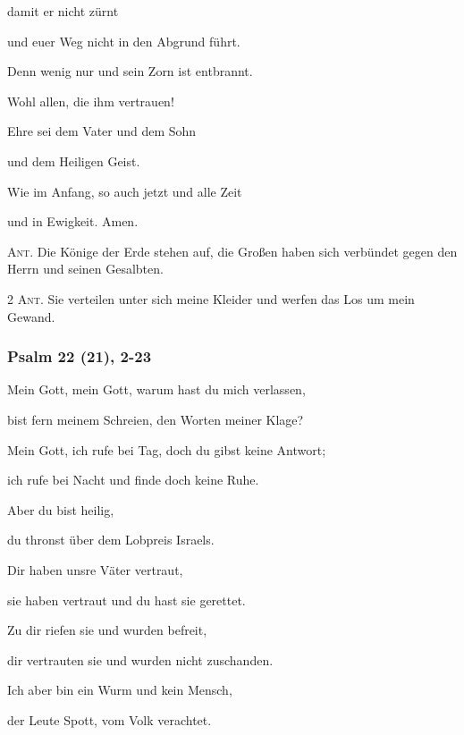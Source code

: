 \noindent damit er nicht zürnt~\GreStar{}~\nopagebreak

und euer Weg nicht in den Abgrund führt. 
 
\noindent Denn wenig nur und sein Zorn ist entbrannt.~\GreStar{}~\nopagebreak

Wohl allen, die ihm vertrauen!

\noindent Ehre sei dem Vater und dem Sohn~\GreStar{}~\nopagebreak

und dem Heiligen Geist.

\noindent Wie im Anfang, so auch jetzt und alle Zeit~\GreStar{}~\nopagebreak

und in Ewigkeit. Amen.

\vspace{10pt}

\noindent \textsc{Ant.} Die Könige der Erde stehen auf, die Großen haben sich verbündet gegen den Herrn und seinen Gesalbten.

\vspace{10pt}


\noindent \textsc{2 Ant.} Sie verteilen unter sich meine Kleider und werfen das Los um mein Gewand.

\subsubsection{Psalm 22 (21), 2-23}

\noindent Mein Gott, mein Gott, warum hast du mich verlassen,~\GreStar{}~\nopagebreak

bist fern meinem Schreien, den Worten meiner Klage?
 
\noindent Mein Gott, ich rufe bei Tag, doch du gibst keine Antwort;~\GreStar{}~\nopagebreak

ich rufe bei Nacht und finde doch keine Ruhe.
 
\noindent Aber du bist heilig,~\GreStar{}~\nopagebreak

du thronst über dem Lobpreis Israels.
 
\noindent Dir haben unsre Väter vertraut,~\GreStar{}~\nopagebreak

sie haben vertraut und du hast sie gerettet.
 
\noindent Zu dir riefen sie und wurden befreit,~\GreStar{}~\nopagebreak

dir vertrauten sie und wurden nicht zuschanden.
 
\noindent Ich aber bin ein Wurm und kein Mensch,~\GreStar{}~\nopagebreak

der Leute Spott, vom Volk verachtet.
 
